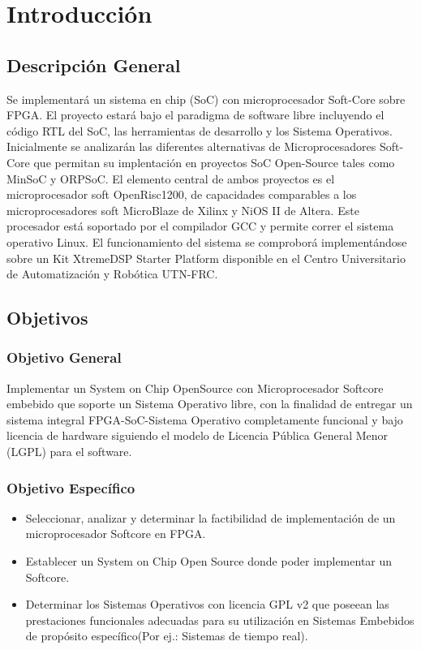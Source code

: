 \chapter{Introducción}

\section{Descripción General}
Se implementará un sistema en chip (SoC) con microprocesador Soft-Core sobre FPGA. El proyecto estará bajo el paradigma de software libre incluyendo
el código RTL del SoC, las herramientas de desarrollo y los Sistema Operativos. Inicialmente se analizarán las diferentes alternativas de
Microprocesadores Soft-Core que permitan su implentación en proyectos SoC Open-Source tales como MinSoC y ORPSoC. El elemento central de
ambos proyectos es el microprocesador soft OpenRisc1200, de capacidades comparables a los microprocesadores soft MicroBlaze de Xilinx y NiOS II de
Altera. Este procesador está soportado por el compilador GCC y permite correr el sistema operativo Linux. El funcionamiento del sistema se comproborá
implementándose sobre un Kit XtremeDSP Starter Platform disponible en el Centro Universitario de Automatización y Robótica UTN-FRC.

\section{Objetivos}
\subsection{Objetivo General}

Implementar un System on Chip OpenSource con Microprocesador Softcore embebido que soporte un Sistema Operativo libre, con la finalidad de entregar
un sistema integral FPGA-SoC-Sistema Operativo completamente funcional y bajo licencia de hardware siguiendo el modelo de Licencia Pública General Menor (LGPL) para el software.


\subsection{Objetivo Específico}
\begin{itemize}
\item Seleccionar, analizar y determinar la factibilidad de implementación de un microprocesador Softcore en FPGA.
\item Establecer un System on Chip Open Source donde poder implementar un Softcore.
\item Determinar los Sistemas Operativos con licencia GPL v2 que poseean las prestaciones funcionales adecuadas para su utilización en Sistemas
Embebidos de propósito específico(Por ej.: Sistemas de tiempo real).
\end{itemize}

